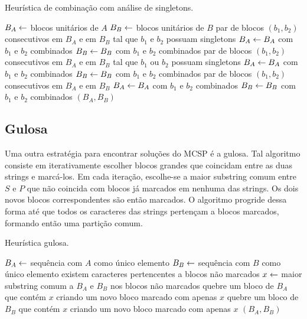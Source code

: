         \begin{algorithm}[htb]
        \caption{Heurística de combinação com análise de singletons.} \label{alg:combineS}
        \begin{codebox}
        \li $B_A \leftarrow$ blocos unitários de $A$
        \li $B_B \leftarrow$ blocos unitários de $B$
        \li \Para \Cada par de blocos $(b_1, b_2)$ consecutivos em $B_A$ e em $B_B$
        \zi tal que $b_1$ e $b_2$ possuam singletons \Faca
            \Do
        \li     $B_A \leftarrow B_A$ com $b_1$ e $b_2$ combinados
        \li     $B_B \leftarrow B_B$ com $b_1$ e $b_2$ combinados
            \End
        \li \Para \Cada par de blocos $(b_1, b_2)$ consecutivos em $B_A$ e em $B_B$
        \zi tal que $b_1$ ou $b_2$ possuam singletons \Faca
            \Do
        \li     $B_A \leftarrow B_A$ com $b_1$ e $b_2$ combinados
        \li     $B_B \leftarrow B_B$ com $b_1$ e $b_2$ combinados
            \End
        \li \Para \Cada par de blocos $(b_1, b_2)$ consecutivos em $B_A$ e em $B_B$ \Faca
            \Do
        \li     $B_A \leftarrow B_A$ com $b_1$ e $b_2$ combinados
        \li     $B_B \leftarrow B_B$ com $b_1$ e $b_2$ combinados
            \End
        \li \Devolva $(B_A, B_B)$
        \end{codebox}
    \end{algorithm}

\subsection{Gulosa}

    Uma outra estratégia para encontrar soluções do MCSP é a gulosa. Tal algoritmo consiste em iterativamente escolher blocos grandes que coincidam entre as duas strings e marcá-los. Em cada iteração, escolhe-se a maior substring comum entre $S$ e $P$ que não coincida com blocos já marcados em nenhuma das strings. Os dois novos blocos correspondentes são então marcados. O algoritmo progride dessa forma até que todos os caracteres das strings pertençam a blocos marcados, formando então uma partição comum. 

    \begin{algorithm}[htb]
        \caption{Heurística gulosa.} \label{alg:greedy}
        \begin{codebox}
        \li $B_A \leftarrow$ sequência com $A$ como único elemento
        \li $B_B \leftarrow$ sequência com $B$ como único elemento
        \li \Enquanto existem caracteres pertencentes a blocos não marcados \Faca
            \Do
        \li     $x \leftarrow$ maior substring comum a $B_A$ e $B_B$ nos blocos não marcados
        \li     quebre um bloco de $B_A$ que contém $x$ criando um novo bloco marcado com apenas $x$
        \li     quebre um bloco de $B_B$ que contém $x$ criando um novo bloco marcado com apenas $x$
            \End
        \li \Devolva $(B_A, B_B)$
        \end{codebox}
    \end{algorithm}

